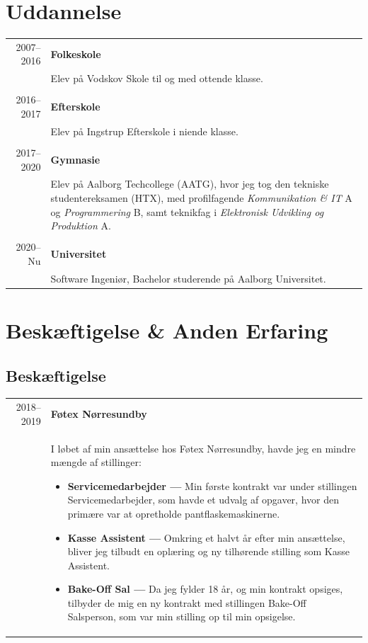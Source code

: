 \documentclass{article}
\begin{document}
    \section*{Uddannelse}
    \begin{tabular}{r|p{.82\linewidth}} 
        2007--2016 & \textbf{Folkeskole}\\
    &   Elev på Vodskov Skole til og med ottende klasse.
        \\\\
        2016--2017 & \textbf{Efterskole}\\
    &   Elev på Ingstrup Efterskole i niende klasse.
        \\\\
        2017--2020 & \textbf{Gymnasie}\\
    &   Elev på Aalborg Techcollege (AATG), hvor jeg tog den tekniske studentereksamen (HTX),
        med profilfagende \textit{Kommunikation \& IT} A og \textit{Programmering} B, samt teknikfag i \textit{Elektronisk Udvikling og Produktion} A.
        \\\\
        2020--Nu & \textbf{Universitet}\\
    &   Software Ingeniør, Bachelor studerende på Aalborg Universitet.
    \end{tabular}
 
    \section*{Beskæftigelse \& Anden Erfaring}
    \subsection*{Beskæftigelse}
    \begin{tabular}{r|p{.82\linewidth}}%
        2018--2019 & \textbf{Føtex Nørresundby}\\
    &   I løbet af min ansættelse hos Føtex Nørresundby, havde jeg en mindre mængde af stillinger:
        \begin{itemize}\setlength\itemsep{0em}
            \item[] \textbf{Servicemedarbejder --- } Min første kontrakt var under stillingen 
                Servicemedarbejder, som havde et udvalg af opgaver, hvor den primære var at
                opretholde pantflaskemaskinerne.
            \item[] \textbf{Kasse Assistent --- } Omkring et halvt år efter min ansættelse, bliver
                jeg tilbudt en oplæring og ny tilhørende stilling som Kasse Assistent.
            \item[] \textbf{Bake-Off Sal --- } Da jeg fylder 18 år, og min kontrakt opsiges,
                tilbyder de mig en ny kontrakt med stillingen Bake-Off Salsperson, som var min stilling
                op til min opsigelse.
        \end{itemize}
    \end{tabular}
\end{document}

